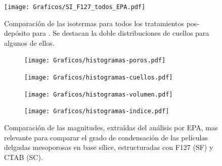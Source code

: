 			\begin{figure}[th!]
		 	   	   \begin{center}
		 	   	   \texttt{[image: Graficos/SI\_F127\_todos\_EPA.pdf]}
			   	   \caption[Comparación PEA tratamientos alternativos (F127)]{Comparación de las isotermas para todos los tratamientos pos-depósito para \pdmF\space. Se destacan la doble distribuciones de cuellos para algunos de ellos.}
				   \label{fig:todos_EPA_F127}	
				   \end{center}
				   \end{figure}	

				   \begin{figure}[ht!]
				 	   	    
				 	   	    \begin{subfigure}[t]{0.5\textwidth}
				        	\texttt{[image: Graficos/histogramas-poros.pdf]}
				       		\end{subfigure}
				         	\begin{subfigure}[t]{0.5\textwidth}
				        	\texttt{[image: Graficos/histogramas-cuellos.pdf]}
				       		\end{subfigure}
				         	 \begin{subfigure}[t]{0.5\textwidth}
				        	\texttt{[image: Graficos/histogramas-volumen.pdf]}
				       		\end{subfigure}
				         	\begin{subfigure}[t]{0.5\textwidth}
				        	\texttt{[image: Graficos/histogramas-indice.pdf]}
				       		\end{subfigure}
				     		\caption[a]{Comparación de las magnitudes, extraídas del análisis por EPA, mas relevante para comparar el grado de condensación de las películas delgadas mesoporosas en base sílice, estructuradas con F127 (SF) y CTAB (SC).}
				     		\label{fig:histogramas}
				     		\end{figure}
		
